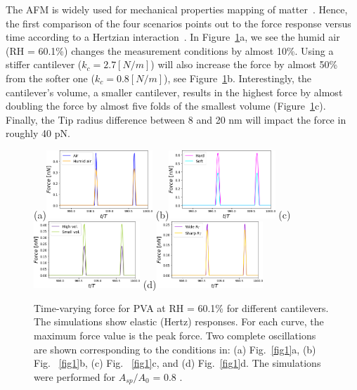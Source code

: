 \documentclass[letterpaper,compsoc,twoside]{IEEEtran}
\begin{document}
The AFM is widely used for mechanical properties mapping of matter~\cite{GarciaRev2021}. Hence, the first comparison of the four scenarios points out to the force response versus time according to a Hertzian interaction~\cite{GuzmanScalingBJON2015}. In Figure~\ref{fig2}a, we see the humid air (RH = 60.1\%) changes the measurement conditions by almost 10\%. Using a stiffer cantilever ($k_c=2.7 [N/m]$) will also increase the force by almost 50\% from the softer one ($k_c=0.8 [N/m]$), see Figure~\ref{fig2}b. Interestingly, the cantilever's volume, a smaller cantilever, results in the highest force by almost doubling the force by almost five folds of the smallest volume (Figure~\ref{fig2}c). Finally, the Tip radius difference between 8 and 20 nm will impact the force in roughly 40 pN.

\begin{figure}[H]
\centering
\subfigure(a){\includegraphics[width=40mm]{fig2aHR3.png}}
\subfigure(b){\includegraphics[width=40mm]{fig2bHR3.png}}
\subfigure(c){\includegraphics[width=40mm]{fig2cHR3.png}}
\subfigure(d){\includegraphics[width=40mm]{fig2dHR3.png}}
\caption{Time-varying force for PVA at RH = 60.1\% for different cantilevers. The simulations show elastic (Hertz) responses. For each curve, the maximum force value is the peak force. Two complete oscillations are shown corresponding to the conditions in: (a)  Fig.~\ref{fig1}a, (b) Fig.~ \ref{fig1}b, (c) Fig.~ \ref{fig1}c, and (d) Fig.~\ref{fig1}d. The simulations were performed for $A_{sp}/A_{0}$ = 0.8 .} \label{fig2}
\end{figure}
\end{document}

